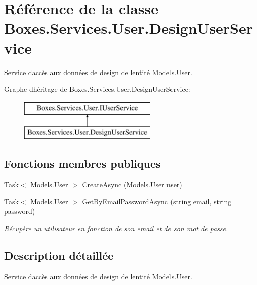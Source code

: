 \hypertarget{class_boxes_1_1_services_1_1_user_1_1_design_user_service}{}\section{Référence de la classe Boxes.\+Services.\+User.\+Design\+User\+Service}
\label{class_boxes_1_1_services_1_1_user_1_1_design_user_service}


Service d\textquotesingle{}accès aux données de design de l\textquotesingle{}entité \hyperlink{class_boxes_1_1_models_1_1_user}{Models.\+User}.  


Graphe d\textquotesingle{}héritage de Boxes.\+Services.\+User.\+Design\+User\+Service\+:\begin{figure}[H]
\begin{center}
\leavevmode
\includegraphics[height=2.000000cm]{class_boxes_1_1_services_1_1_user_1_1_design_user_service}
\end{center}
\end{figure}
\subsection*{Fonctions membres publiques}
\begin{DoxyCompactItemize}
\item 
Task$<$ \hyperlink{class_boxes_1_1_models_1_1_user}{Models.\+User} $>$ \hyperlink{class_boxes_1_1_services_1_1_user_1_1_design_user_service_a2d217193ac6d06680676d386ef334db5}{Create\+Async} (\hyperlink{class_boxes_1_1_models_1_1_user}{Models.\+User} user)
\item 
Task$<$ \hyperlink{class_boxes_1_1_models_1_1_user}{Models.\+User} $>$ \hyperlink{class_boxes_1_1_services_1_1_user_1_1_design_user_service_a3ac7a5901cd976b715f819ab19f5f4eb}{Get\+By\+Email\+Password\+Async} (string email, string password)
\begin{DoxyCompactList}\small\item\em Récupère un utilisateur en fonction de son email et de son mot de passe.  \end{DoxyCompactList}\end{DoxyCompactItemize}


\subsection{Description détaillée}
Service d\textquotesingle{}accès aux données de design de l\textquotesingle{}entité \hyperlink{class_boxes_1_1_models_1_1_user}{Models.\+User}. 



